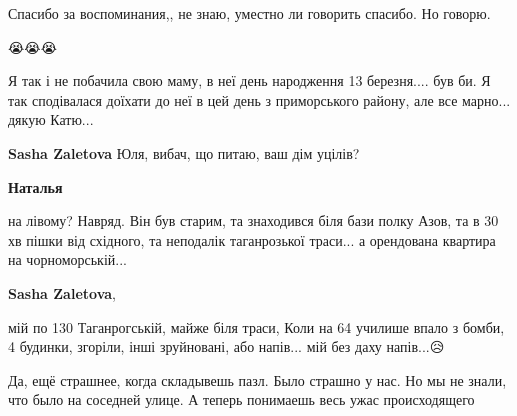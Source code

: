  
 
 
 
 

\qqSecCmt


Спасибо за воспоминания,, не знаю, уместно ли говорить спасибо. Но говорю.


😭😭😭


Я так і не побачила свою маму, в неї день народження 13 березня.... був би. Я
так сподівалася доїхати до неї в цей день з приморського району, але все
марно... дякую Катю...

\begin{itemize} %
\textbf{Sasha Zaletova} Юля, вибач, що питаю, ваш дім уцілів?

\textbf{Наталья} 

на лівому? Навряд. Він був старим, та знаходився біля бази полку Азов, та в 30
хв пішки від східного, та неподалік таганрозької траси... а орендована квартира
на чорноморській...

\textbf{Sasha Zaletova},

мій по 130 Таганрогській, майже біля траси, Коли на 64 училише впало з бомби, 4
будинки, згоріли, інші зруйновані, або напів... мій без даху напів...😥

\end{itemize} %


Да, ещё страшнее, когда складывешь пазл. Было страшно у нас. Но мы не знали,
что было на соседней улице. А теперь понимаешь весь ужас происходящего

